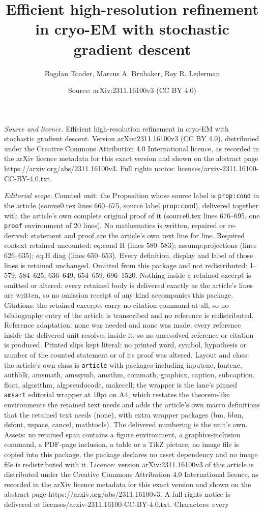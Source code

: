 \documentclass[10pt,a4paper]{amsart}
\title[Efficient high-resolution refinement in cryo-EM with stochas]{Efficient high-resolution refinement in cryo-EM with stochastic gradient descent}
\author{Bogdan Toader, Marcus A. Brubaker, Roy R. Lederman}
\date{Source: arXiv:2311.16100v3 (CC BY 4.0)}
\begin{document}
\maketitle

\noindent\emph{Source and licence.} Efficient high-resolution refinement in cryo-EM with stochastic gradient descent. Version arXiv:2311.16100v3 (CC BY 4.0), distributed under the Creative Commons Attribution 4.0 International licence, as recorded in the arXiv licence metadata for this exact version and shown on the abstract page https://arxiv.org/abs/2311.16100v3. Full rights notice: licenses/arxiv-2311.16100-CC-BY-4.0.txt.\par\smallskip

\noindent\textit{Editorial scope.} Counted unit: the Proposition whose source label is \texttt{prop:cond} in the article (source0.tex lines 660--675, source label \texttt{prop:cond}), delivered together with the article's own complete original proof of it (source0.tex lines 676--695, one \texttt{proof} environment of 20 lines). No mathematics is written, repaired or re-derived: statement and proof are the article's own text line for line. Required context retained uncounted: eq:cond H (lines 580--583); assump:projections (lines 626--635); eq:H diag (lines 650--653). Every definition, display and label of those lines is retained unchanged. Omitted from this package and not redistributed: 1--579, 584--625, 636--649, 654--659, 696--1520. Nothing inside a retained excerpt is omitted or altered: every retained body is delivered exactly as the article's lines are written, so no omission receipt of any kind accompanies this package. Citations: the retained excerpts carry no citation command at all, so no bibliography entry of the article is transcribed and no reference is redistributed. Reference adaptation: none was needed and none was made; every reference inside the delivered unit resolves inside it, so no unresolved reference or citation is produced. Printed slips kept literal: no printed word, symbol, hypothesis or number of the counted statement or of its proof was altered. Layout and class: the article's own class is \texttt{article} with packages including inputenc, fontenc, authblk, amsmath, amssymb, amsthm, commath, graphicx, caption, subcaption, float, algorithm, algpseudocode, makecell; the wrapper is the lane's pinned \texttt{amsart} editorial wrapper at 10pt on A4, which restates the theorem-like environments the retained text needs and adds the article's own macro definitions that the retained text needs (none), with extra wrapper packages (bm, bbm, dsfont, xspace, cancel, mathtools). The delivered numbering is the unit's own. Assets: no retained span contains a figure environment, a graphics-inclusion command, a PDF-page inclusion, a table or a TikZ picture; no image file is copied into this package, the package declares no asset dependency and no image file is redistributed with it. Licence: version arXiv:2311.16100v3 of this article is distributed under the Creative Commons Attribution 4.0 International licence, as recorded in the arXiv licence metadata for this exact version and shown on the abstract page https://arxiv.org/abs/2311.16100v3. A full rights notice is delivered at licenses/arxiv-2311.16100-CC-BY-4.0.txt. Characters: every 
\end{document}
